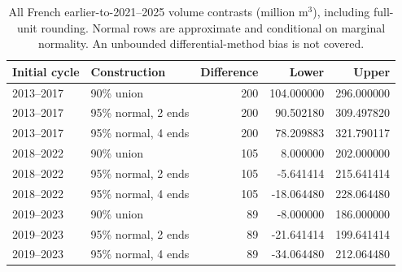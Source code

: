 \begin{table}[htbp]
\centering\small
\caption{All French earlier-to-2021--2025 volume contrasts (million m$^3$), including full-unit rounding. Normal rows are approximate and conditional on marginal normality. An unbounded differential-method bias is not covered.}\label{tab:SI_France_contrasts}
\begin{tabularx}{\textwidth}{llrrr}\toprule
Initial cycle & Construction & Difference & Lower & Upper\\\midrule
2013--2017 & 90\% union & 200 & 104.000000 & 296.000000\\
2013--2017 & 95\% normal, 2 ends & 200 & 90.502180 & 309.497820\\
2013--2017 & 95\% normal, 4 ends & 200 & 78.209883 & 321.790117\\
2018--2022 & 90\% union & 105 & 8.000000 & 202.000000\\
2018--2022 & 95\% normal, 2 ends & 105 & -5.641414 & 215.641414\\
2018--2022 & 95\% normal, 4 ends & 105 & -18.064480 & 228.064480\\
2019--2023 & 90\% union & 89 & -8.000000 & 186.000000\\
2019--2023 & 95\% normal, 2 ends & 89 & -21.641414 & 199.641414\\
2019--2023 & 95\% normal, 4 ends & 89 & -34.064480 & 212.064480\\
\bottomrule\end{tabularx}
\end{table}
